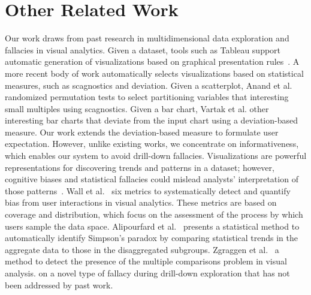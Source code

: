 \section{Other Related Work\label{sec:related}}
Our work draws from past research in multidimensional data exploration and fallacies in visual analytics.  %
Given a dataset, tools such as Tableau support automatic generation of visualizations based on graphical presentation rules~\cite{Mackinlay2007,Wongsuphasawat2016}. 
A more recent body of work automatically selects visualizations based on statistical measures, such as scagnostics and deviation. Given a scatterplot, Anand et al. \cite{Anand2015}  randomized permutation tests to select partitioning variables that  interesting small multiples using scagnostics. Given a bar chart, Vartak et al. \cite{Vartak2015}  other interesting bar charts that deviate from the input chart using a deviation-based measure. Our work extends the deviation-based measure to formulate user expectation. However, unlike existing works, we concentrate on informativeness, which enables our system to avoid drill-down fallacies.
Visualizations are powerful representations for discovering trends and patterns in a dataset; however, cognitive biases and statistical fallacies could mislead analysts' interpretation of those patterns~\cite{Alipourfard2018WSDM,Wall2017,Zgraggen2018CHI,Armstrong2014,Gotz2016}. Wall et al.~\cite{Wall2017}  six metrics to systematically detect and quantify bias from user interactions in visual analytics. These metrics are based on coverage and distribution, which focus on the assessment of the process by which users sample the data space. Alipourfard et al.~\cite{Alipourfard2018WSDM} presents a statistical method to automatically identify Simpson's paradox by comparing statistical trends in the aggregate data to those in the disaggregated subgroups. Zgraggen et al.~\cite{Zgraggen2018CHI}  a method to detect the presence of the multiple comparisons problem in visual analysis.  on a novel type of fallacy during drill-down exploration that has not been addressed by past work. %
